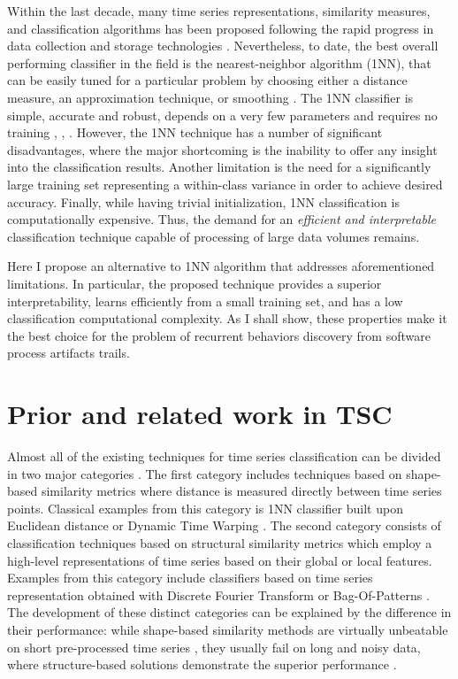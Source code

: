 Within the last decade, many time series representations, similarity measures, and classification algorithms 
has been proposed following the rapid progress in data collection and storage technologies \cite{citeulike:10358271}. 
Nevertheless, to date, the best overall performing classifier in the field is the nearest-neighbor algorithm (1NN), 
that can be easily tuned for a particular problem by choosing either a distance measure, an approximation technique, 
or smoothing \cite{citeulike:10358271}.
The 1NN classifier is simple, accurate and robust, depends on a very few parameters 
and requires no training \cite{citeulike:10358271}, \cite{citeulike:532340}, \cite{citeulike:12563424}.
However, the 1NN technique has a number of significant disadvantages, where the major shortcoming is the 
inability to offer any insight into the classification results. 
Another limitation is the need for a significantly large training set representing a within-class variance 
in order to achieve desired accuracy. 
Finally, while having trivial initialization, 1NN classification is computationally expensive. 
Thus, the demand for an \textit{efficient and interpretable} classification technique capable of processing of 
large data volumes remains.

Here I propose an alternative to 1NN algorithm that addresses aforementioned limitations. 
In particular, the proposed technique provides a superior interpretability, learns efficiently from a small training set,
and has a low classification computational complexity. 
As I shall show, these properties make it the best choice for the problem of recurrent behaviors discovery 
from software process artifacts trails.

\section{Prior and related work in TSC} \label{sax_vsm_prior}
Almost all of the existing techniques for time series classification can be divided in two major categories \cite{citeulike:11796594}. 
The first category includes techniques based on shape-based similarity metrics where distance is measured directly between time 
series points. Classical examples from this category is 1NN classifier built upon Euclidean distance \cite{citeulike:4214336} or 
Dynamic Time Warping \cite{senin2008dynamic}. 
The second category consists of classification techniques based on structural similarity metrics which employ a high-level 
representations of time series based on their global or local features. 
Examples from this category include classifiers based on time series representation obtained with 
Discrete Fourier Transform \cite{citeulike:5094223} or Bag-Of-Patterns \cite{citeulike:10525778}. 
The development of these distinct categories can be explained by the difference in their performance: 
while shape-based similarity methods are virtually unbeatable on short pre-processed time series \cite{citeulike:532340}, 
they usually fail on long and noisy data, where structure-based solutions demonstrate the superior performance \cite{citeulike:10525778}. 

